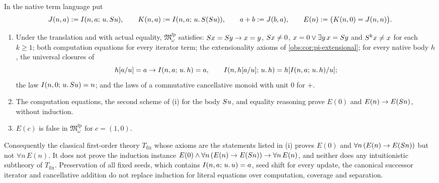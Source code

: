 \begin{theorem}
\label{obs:thm:fixed-points}
In the native term language put
\[
J(n,a)\mathrel{:=}I(n,a;\,u.\,S u),\qquad
K(n,a)\mathrel{:=}I(n,a;\,u.\,S(S u)),\qquad
a+b\mathrel{:=} J(b,a),\qquad
E(n)\mathrel{:=}\bigl(K(n,0)=J(n,n)\bigr).
\]
\begin{enumerate}[label=(\roman*)]
\item Under the translation and with actual equality,
$\mathfrak{M}^{\mathrm{fp}}_\omega$ satisfies: $S x=S y\to x=y$,
$S x\ne 0$, $x=0\vee\exists y\,x=S y$ and $S^{k}x\ne x$ for each
$k\ge 1$; both computation equations for every iterator term; the
extensionality axioms of \cref{obs:cor:pi-extensional}; for every native body
$h$, the universal closures of
\[
h[a/u]=a\to I(n,a;\,u.\,h)=a,\qquad
I(n,h[a/u];\,u.\,h)=h[I(n,a;\,u.\,h)/u];
\]
the law $I(n,0;\,u.\,S u)=n$; and the laws of a commutative cancellative
monoid with unit $0$ for $+$.
\item The computation equations, the second scheme of (i) for the body
$S u$, and equality reasoning prove $E(0)$ and $E(n)\to E(S n)$, without
induction.
\item $E(c)$ is false in $\mathfrak{M}^{\mathrm{fp}}_\omega$ for $c=(1,0)$.
\end{enumerate}
Consequently the classical first-order theory $T_{\mathrm{fix}}$ whose axioms
are the statements listed in (i) proves $E(0)$ and
$\forall n\,(E(n)\to E(S n))$ but not $\forall n\,E(n)$. It does not prove
the induction instance
$E(0)\wedge\forall n\,(E(n)\to E(S n))\to\forall n\,E(n)$, and neither does
any intuitionistic subtheory of $T_{\mathrm{fix}}$. Preservation of all fixed
seeds, which contains $I(n,a;\,u.\,u)=a$, seed shift for every update, the
canonical successor iterator and cancellative addition do not replace
induction for literal equations over computation, coverage and separation.
\end{theorem}

